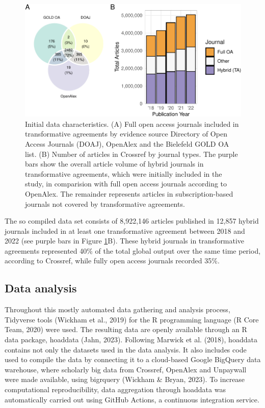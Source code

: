 \documentclass[a4paper,man,floatsintext,longtable,noextraspace,12pt]{apa6}
\begin{document}
\begin{figure}[ht!]

{\centering \includegraphics[width=0.99\linewidth,]{fig/method_fig-1} 

}

\caption{Initial data characteristics. (A) Full open access journals included in transformative agreements by evidence source Directory of Open Access Journals (DOAJ), OpenAlex and the Bielefeld GOLD OA list. (B) Number of articles in Crossref by journal types. The purple bars show the overall article volume of hybrid journals in transformative agreements, which were initially included in the study, in comparision with full open access journals according to OpenAlex. The remainder represents articles in subscription-based journals not covered by transformative agreements.}\label{fig:method_fig}
\end{figure}

The so compiled data set consists of 8,922,146 articles published in
12,857 hybrid journals included in at least one transformative agreement
between 2018 and 2022 (see purple bars in Figure \ref{fig:method_fig}B).
These hybrid journals in transformative agreements represented 40\% of
the total global output over the same time period, according to
Crossref, while fully open access journals recorded 35\%.

\subsection{Data analysis}\label{data-analysis}

Throughout this mostly automated data gathering and analysis process,
Tidyverse tools (Wickham et al., 2019) for the R programming language (R
Core Team, 2020) were used. The resulting data are openly available
through an R data package, hoaddata (Jahn, 2023). Following Marwick et
al. (2018), hoaddata contains not only the datasets used in the data
analysis. It also includes code used to compile the data by connecting
it to a cloud-based Google BigQuery data warehouse, where scholarly big
data from Crossref, OpenAlex and Unpaywall were made available, using
bigrquery (Wickham \& Bryan, 2023). To increase computational
reproducibility, data aggregation through hoaddata was automatically
carried out using GitHub Actions, a continuous integration service.
\end{document}
